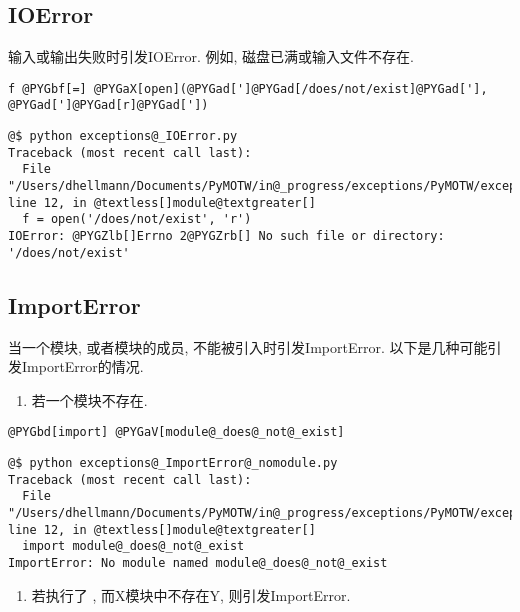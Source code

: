 \documentclass[a4paper,10pt,english]{manual}
\begin{document}
\subsection{IOError}

输入或输出失败时引发IOError. 例如, 磁盘已满或输入文件不存在.

\begin{Verbatim}[commandchars=@\[\]]
f @PYGbf[=] @PYGaX[open](@PYGad[']@PYGad[/does/not/exist]@PYGad['], @PYGad[']@PYGad[r]@PYGad['])
\end{Verbatim}

\begin{Verbatim}[commandchars=@\[\]]
@$ python exceptions@_IOError.py
Traceback (most recent call last):
  File "/Users/dhellmann/Documents/PyMOTW/in@_progress/exceptions/PyMOTW/exceptions/exceptions@_IOError.py", line 12, in @textless[]module@textgreater[]
  f = open('/does/not/exist', 'r')
IOError: @PYGZlb[]Errno 2@PYGZrb[] No such file or directory: '/does/not/exist'
\end{Verbatim}


\subsection{ImportError}

当一个模块, 或者模块的成员, 不能被引入时引发ImportError. 以下是几种可能引发ImportError的情况.
\begin{enumerate}
\item {} 
若一个模块不存在.

\end{enumerate}

\begin{Verbatim}[commandchars=@\[\]]
@PYGbd[import] @PYGaV[module@_does@_not@_exist]
\end{Verbatim}

\begin{Verbatim}[commandchars=@\[\]]
@$ python exceptions@_ImportError@_nomodule.py
Traceback (most recent call last):
  File "/Users/dhellmann/Documents/PyMOTW/in@_progress/exceptions/PyMOTW/exceptions/exceptions@_ImportError@_nomodule.py", line 12, in @textless[]module@textgreater[]
  import module@_does@_not@_exist
ImportError: No module named module@_does@_not@_exist
\end{Verbatim}
\begin{enumerate}
\item {} 
若执行了 , 而X模块中不存在Y, 则引发ImportError.

\end{enumerate}
\end{document}
